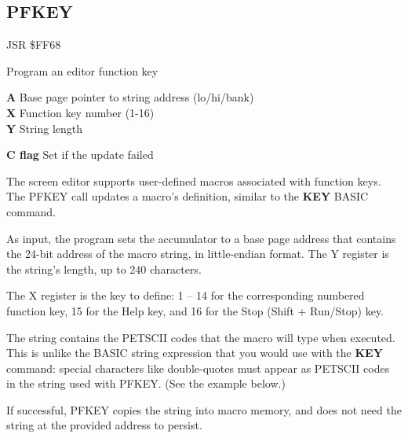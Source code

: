 \subsection{PFKEY}
\label{KERNAL Jump Table!PFKEY}
\begin{description}[leftmargin=2cm,style=nextline]
    \item [Address:] JSR \$FF68
    \item [Description:] Program an editor function key
    \item [Inputs:]
        \textbf{A} Base page pointer to string address (lo/hi/bank) \\
        \textbf{X} Function key number (1-16) \\
        \textbf{Y} String length
    \item [Outputs:]
        \textbf{C flag} Set if the update failed
    \item [Remarks:]
        The screen editor supports user-defined macros associated with function keys. The PFKEY call updates a macro's definition, similar to the \textbf{KEY} BASIC command.

        As input, the program sets the accumulator to a base page address that contains the 24-bit address of the macro string, in little-endian format. The Y register is the string's length, up to 240 characters.

        The X register is the key to define: 1 -- 14 for the corresponding numbered function key, 15 for the Help key, and 16 for the Stop (Shift + Run/Stop) key.

        The string contains the PETSCII codes that the macro will type when executed. This is unlike the BASIC string expression that you would use with the \textbf{KEY} command: special characters like double-quotes must appear as PETSCII codes in the string used with PFKEY. (See the example below.)

        If successful, PFKEY copies the string into macro memory, and does not need the string at the provided address to persist.
    \item [Example:]
\end{description}


